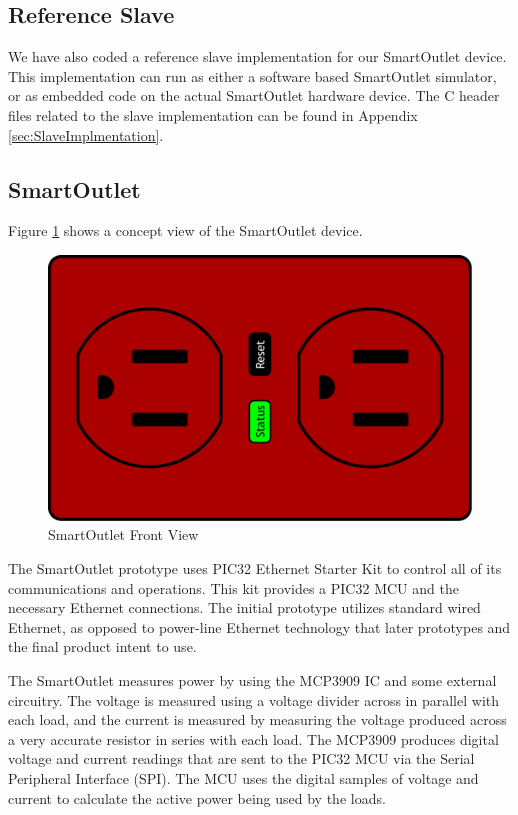 \documentclass[11pt]{article}
\begin{document}
\subsection{Reference Slave}
\label{sec:Implementaion.ReferenceSlave}
We have also coded a reference slave implementation for our SmartOutlet
device. This implementation can run as either a software based
SmartOutlet simulator, or as embedded code on the actual SmartOutlet
hardware device. The C header files related to the slave implementation
can be found in Appendix \ref{sec:SlaveImplmentation}.

\subsection{SmartOutlet}

Figure \ref{fig:outletFront} shows a concept view of the SmartOutlet device.

\begin{figure}
  \begin{center}
    \includegraphics[scale=.5]{outlet.pdf}
  \end{center}
  \caption{SmartOutlet Front View}
  \label{fig:outletFront}
\end{figure}

The SmartOutlet prototype uses PIC32 Ethernet Starter Kit to control
all of its communications and operations. This kit provides a PIC32
MCU and the necessary Ethernet connections. The initial prototype
utilizes standard wired Ethernet, as opposed to power-line Ethernet
technology that later prototypes and the final product intent to use.

The SmartOutlet measures power by using the MCP3909 IC and some
external circuitry.  The voltage is measured using a voltage divider
across in parallel with each load, and the current is measured by
measuring the voltage produced across a
very accurate resistor in series with each load.
The MCP3909 produces digital voltage and current
readings that are sent to the PIC32 MCU via the Serial Peripheral
Interface (SPI). The MCU uses the digital samples of voltage and
current to calculate the active power being used by the loads.
\end{document}

